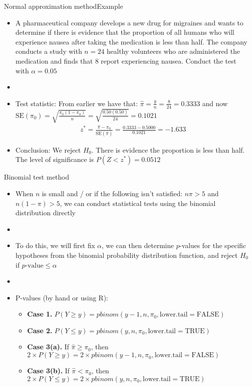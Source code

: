 \documentclass[xcolor=dvipsnames]{beamer}
\begin{document}
\begin{frame}{Normal approximation method}{Example}
	\begin{itemize}
		\item A pharmaceutical company develops a new drug for migraines and wants to determine if there is evidence that the proportion of all humans who will experience nausea after taking the medication is less than half. The company conducts a study with $n = 24$ healthy volunteers who are administered the medication and finds that 8 report experiencing nausea. Conduct the test with $\alpha = 0.05$
		\item[]
		\item Test statistic: From earlier we have that: $\hat{\pi} = \frac{y}{n} = \frac{8}{24} = 0.3333$ and now $\text{SE}(\pi_0)=\sqrt{\frac{\pi_0(1-\pi_0)}{n}} = \sqrt{\frac{0.50(0.50)}{24}} = 0.1021$  \pause
			\begin{gather*}
				z^* = \frac{\hat{\pi}-\pi_0}{\text{SE}(\hat{\pi})} = \frac{0.3333-0.5000}{0.1021} =-1.633
			\end{gather*} \pause
		\item Conclusion: We reject $H_0$. There is evidence the proportion is less than half. The level of significance is $P(Z < z^*) = 0.0512$
	\end{itemize}
\end{frame}

\begin{frame}{Binomial test method}
	\begin{itemize}
		\item When $n$ is small and / or if the following isn't satisfied: $n \pi > 5$ and $n(1-\pi) > 5$, we can conduct statistical tests using the binomial distribution directly  \pause
		\item[]
		\item To do this, we will first fix $\alpha$, we can then determine $p$-values for the specific hypotheses from the binomial probability distribution function, and reject $H_0$ if $p\text{-value} \leq \alpha$  \pause
		\item[]
		\item P-values (by hand or using R):
		\begin{itemize}
			\item \textbf{Case 1.} $P(Y \geq y) = pbinom(y - 1, n, \pi_0, \text{lower.tail} = \text{FALSE})$  \pause
			\item \textbf{Case 2.} $P(Y \leq y) = pbinom(y, n, \pi_0, \text{lower.tail} = \text{TRUE})$  \pause
			\item \textbf{Case 3(a).} If $\hat{\pi}\geq \pi_0$, then $2\times P(Y \geq y) = 2 \times pbinom(y - 1, n, \pi_0, \text{lower.tail} = \text{FALSE})$  \pause
			\item \textbf{Case 3(b).} If $\hat{\pi}< \pi_0$, then $2 \times P(Y \leq y) = 2 \times pbinom(y, n, \pi_0, \text{lower.tail} = \text{TRUE})$
		\end{itemize}
	\end{itemize}
\end{frame}
\end{document}
